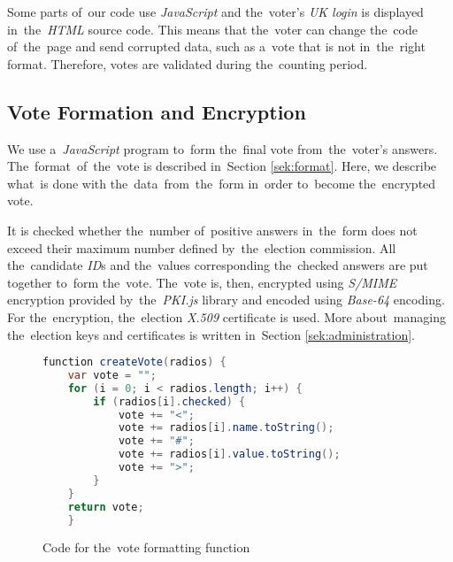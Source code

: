 Some parts of~our code use \emph{JavaScript} and the~voter's \emph{UK login} is displayed in~the~\emph{HTML} source code. This means that the~voter  can change the~code of~the~page and send corrupted data, such as a~vote that is not in~the~right format. Therefore, votes are validated during the~counting period.

\subsection{Vote Formation and Encryption}
\label{sub:formation}
We use a~\emph{JavaScript} program to~form the~final vote from~the~voter's answers. The~format~of~the~vote is described in~Section \ref{sek:format}. Here, we describe what~is done with the~data~from~the~form in~order to~become the~encrypted vote.

It is checked whether the~number of~positive answers in~the~form does not exceed their maximum number defined by~the~election commission. All the~candidate \emph{ID}s and the~values corresponding the~checked answers are put together to~form the~vote. The~vote is, then, encrypted using \emph{S/MIME} encryption provided by~the~\emph{PKI.js} library and encoded using \emph{Base-64} encoding. For the~encryption, the~election \emph{X.509} certificate is used. More about~managing the~election keys and certificates is written in~Section \ref{sek:administration}.%

\begin{figure}[h]
\begin{lstlisting}[language=Java]
function createVote(radios) {
    var vote = "";
    for (i = 0; i < radios.length; i++) {
        if (radios[i].checked) {
            vote += "<";
            vote += radios[i].name.toString();
            vote += "#";
            vote += radios[i].value.toString();
            vote += ">";
        }
    }
    return vote;
    }
\end{lstlisting}
\caption{Code for the~vote formatting function}
\end{figure}
